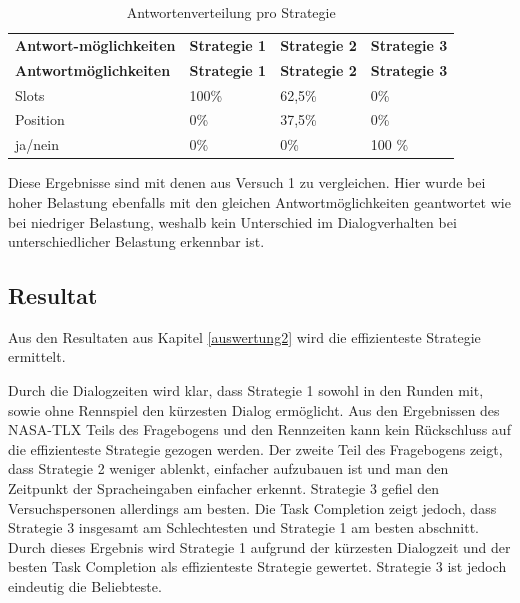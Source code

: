 \documentclass[12pt,a4paper]{scrartcl}
\begin{document}
\begin{longtable}{p{3cm}p{3cm}p{3cm}p{3cm} }
	\label{Dialogverhalten12}\\
	\caption[Antwortenverteilung pro Strategie]{Antwortenverteilung pro Strategie}\\
	\hline
\textbf{Antwort-möglichkeiten}&\textbf{Strategie 1}&\textbf{Strategie 2} &\textbf{Strategie 3}\\
	\hline
	\endfirsthead
	\hline
	\textbf{Antwortmöglichkeiten}&\textbf{Strategie 1}&\textbf{Strategie 2} &\textbf{Strategie 3}\\
	\hline
	\endhead
Slots & 100\% & 62,5\%\ & 0\%  \\
Position & 0\% & 37,5\% & 0\%  \\
ja/nein & 0\% & 0\%  & 100 \%  \\
\hline
\end{longtable}
Diese Ergebnisse sind mit denen aus Versuch 1 zu vergleichen. 
Hier wurde bei hoher Belastung ebenfalls mit den gleichen Antwortmöglichkeiten geantwortet wie bei niedriger Belastung, weshalb kein Unterschied im Dialogverhalten bei unterschiedlicher Belastung erkennbar ist. 




\subsection{Resultat}
Aus den Resultaten aus Kapitel \ref{auswertung2} wird die effizienteste Strategie ermittelt. \newline

Durch die Dialogzeiten wird klar, dass Strategie 1 sowohl in den Runden mit, sowie ohne Rennspiel den kürzesten Dialog ermöglicht. Aus den Ergebnissen des NASA-TLX Teils des Fragebogens und den Rennzeiten kann kein Rückschluss auf die effizienteste Strategie gezogen werden. Der zweite Teil des Fragebogens zeigt, dass Strategie 2 weniger ablenkt, einfacher aufzubauen ist und man den Zeitpunkt der Spracheingaben einfacher erkennt. Strategie 3 gefiel den Versuchspersonen allerdings am besten. Die Task Completion zeigt jedoch, dass Strategie 3 insgesamt am Schlechtesten und Strategie 1 am besten abschnitt. \newline
Durch dieses Ergebnis wird Strategie 1 aufgrund der kürzesten Dialogzeit und der besten Task Completion als effizienteste Strategie gewertet. Strategie 3 ist jedoch eindeutig die Beliebteste. 
\end{document}
